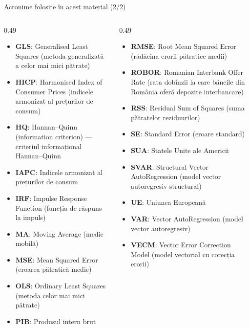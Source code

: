 \begin{frame}{Acronime folosite în acest material (2/2)}
\begin{columns}[T]
\begin{column}{0.49\textwidth}
\begin{itemize}\setlength{\itemsep}{0pt}
    \item \textbf{GLS}: Generalised Least Squares (metoda generalizată a celor mai mici pătrate)
    \item \textbf{HICP}: Harmonised Index of Consumer Prices (indicele armonizat al prețurilor de consum)
    \item \textbf{HQ}: Hannan–Quinn (information criterion) — criteriul informațional Hannan–Quinn
    \item \textbf{IAPC}: Indicele armonizat al prețurilor de consum
    \item \textbf{IRF}: Impulse Response Function (funcția de răspuns la impuls)
    \item \textbf{MA}: Moving Average (medie mobilă)
    \item \textbf{MSE}: Mean Squared Error (eroarea pătratică medie)
    \item \textbf{OLS}: Ordinary Least Squares (metoda celor mai mici pătrate)
    \item \textbf{PIB}: Produsul intern brut
\end{itemize}
\end{column}
\begin{column}{0.49\textwidth}
\begin{itemize}\setlength{\itemsep}{0pt}
    \item \textbf{RMSE}: Root Mean Squared Error (rădăcina erorii pătratice medii)
    \item \textbf{ROBOR}: Romanian Interbank Offer Rate (rata dobînzii la care băncile din România oferă depozite interbancare)
    \item \textbf{RSS}: Residual Sum of Squares (suma pătratelor reziduurilor)
    \item \textbf{SE}: Standard Error (eroare standard)
    \item \textbf{SUA}: Statele Unite ale Americii
    \item \textbf{SVAR}: Structural Vector AutoRegression (model vector autoregresiv structural)
    \item \textbf{UE}: Uniunea Europeană
    \item \textbf{VAR}: Vector AutoRegression (model vector autoregresiv)
    \item \textbf{VECM}: Vector Error Correction Model (model vectorial cu corecția erorii)
\end{itemize}
\end{column}
\end{columns}
\end{frame}

